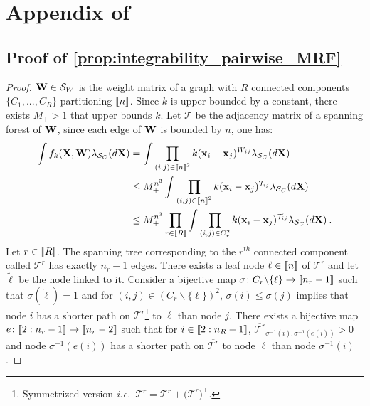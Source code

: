 
\section{Appendix of }

\subsection{Proof of \cref{prop:integrability_pairwise_MRF}} \label{proof:lambda_perp_integrability}

\integrabilitypairwiseMRF*

\begin{proof}
$\mathbf{W} \in \mathcal{S}_W$ is the weight matrix of a graph with $R$ connected components $\{C_1, ..., C_R\}$ partitioning ${[\![n]\!]}$. Since $k$ is upper bounded by a constant, there exists $M_+ > 1$ that upper bounds $k$. Let $\bm{\mathcal{T}}$ be the adjacency matrix of a spanning forest of $\mathbf{W}$, since each edge of $\mathbf{W}$ is bounded by $n$, one has:
\begin{align}
    \int f_{k}(\mathbf{X}, \mathbf{W}) \lambda_{\mathcal{S}_{C}}(d\mathbf{X}) &= \int \prod_{(i,j) \in {[\![n]\!]}^2} k(\mathbf{x}_{i} - \mathbf{x}_{j})^{W_{ij}} \lambda_{\mathcal{S}_{C}}(d\mathbf{X}) \nonumber \\
    &\leq M_+^{n^{3}} \int \prod_{(i,j) \in {[\![n]\!]}^2} k(\mathbf{x}_{i} - \mathbf{x}_{j})^{\mathcal{T}_{ij}} \lambda_{\mathcal{S}_{C}}(d\mathbf{X}) \nonumber \\
    &\leq M_+^{n^{3}} \prod_{r \in {[\![R]\!]}} \int \prod_{(i,j) \in C_{r}^2} k(\mathbf{x}_{i} - \mathbf{x}_{j})^{\mathcal{T}_{ij}} \lambda_{\mathcal{S}_{C}}(d\mathbf{X}) \:. \label{bound_MRF_product_CC}
\end{align}
Let $r \in {[\![R]\!]}$. The spanning tree corresponding to the $r^{th}$ connected component called $\bm{\mathcal{T}}^r$ has exactly $n_r-1$ edges. There exists a leaf node $\ell \in {[\![n]\!]}$ of $\bm{\mathcal{T}}^r$ and let $\tilde{\ell}$ be the node linked to it. Consider a bijective map $\sigma \colon C_r \backslash \{\ell\} \to {[\![n_r - 1]\!]}$ such that $\sigma(\tilde{\ell}) = 1$ and for $(i,j) \in (C_r \backslash \{\ell\})^2$, $\sigma(i) \leq \sigma(j)$ implies that node $i$ has a shorter path on $\overline{\bm{\mathcal{T}}^r}$\footnote{Symmetrized version \textit{i.e.}\ $\overline{\bm{\mathcal{T}}^r} = \bm{\mathcal{T}}^r + \bm{(\mathcal{T}}^r)^\top$.} to $\ell$ than node $j$. There exists a bijective map $e \colon {[\![2:n_r - 1]\!]} \to {[\![n_r - 2]\!]}$ such that for $i \in {[\![2:n_R-1]\!]}$, $\overline{\bm{\mathcal{T}}^r}_{\sigma^{-1}(i), \sigma^{-1}(e(i))} > 0$ and node $\sigma^{-1}(e(i))$ has a shorter path on $\overline{\bm{\mathcal{T}}^r}$ to node $\ell$ than node $\sigma^{-1}(i)$.


\end{proof}
